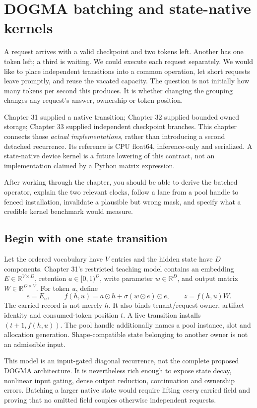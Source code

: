 \chapter{DOGMA batching and state-native kernels}
\label{evod34:chapter}

A request arrives with a valid checkpoint and two tokens left. Another has one
token left; a third is waiting. We could execute each request separately.
We would like to place independent transitions into a common operation, let
short requests leave promptly, and reuse the vacated capacity. The question is
not initially how many tokens per second this produces. It is whether changing
the grouping changes any request's answer, ownership or token position.

Chapter 31 supplied a native transition; Chapter 32 supplied bounded owned
storage; Chapter 33 supplied independent checkpoint branches. This chapter
connects those \emph{actual implementations}, rather than introducing a second
detached recurrence. Its reference is CPU float64, inference-only and
serialized. A state-native device kernel is a future lowering of this contract,
not an implementation claimed by a Python matrix expression.

After working through the chapter, you should be able to derive the batched
operator, explain the two relevant clocks, follow a lane from a pool handle to
fenced installation, invalidate a plausible but wrong mask, and specify what
a credible kernel benchmark would measure.

\section{Begin with one state transition}
\label{evod34:scalar}
Let the ordered vocabulary have $V$ entries and the hidden state have $D$
components. Chapter 31's restricted teaching model contains an embedding
$E\in\mathbb R^{V\times D}$, retention $a\in[0,1)^D$, write parameter
$w\in\mathbb R^D$, and output matrix $W\in\mathbb R^{D\times V}$.
For token $u$, define
\[
 e=E_u,\qquad
 f(h,u)=a\odot h+\sigma(w\odot e)\odot e,\qquad
 z=f(h,u)W.
\]
The carried record is not merely $h$. It also binds tenant/request owner,
artifact identity and consumed-token position $t$. A live transition installs
$(t+1,f(h,u))$. The pool handle additionally names a pool instance, slot and
allocation generation. Shape-compatible state belonging to another owner is
not an admissible input.

This model is an input-gated diagonal recurrence, not the complete proposed
DOGMA architecture. It is nevertheless rich enough to expose state decay,
nonlinear input gating, dense output reduction, continuation and ownership
errors. Batching a larger native state would require lifting \emph{every}
carried field and proving that no omitted field couples otherwise independent
requests.

